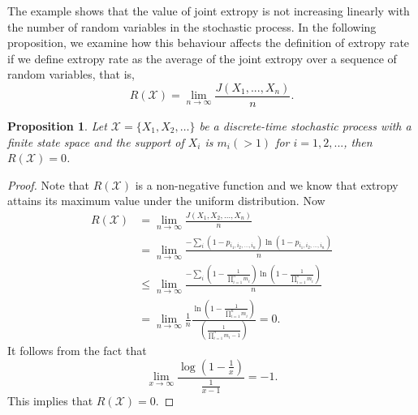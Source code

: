 \documentclass[pdflatex]{sn-jnl}%
\theoremstyle{thmstyleone}
\newtheorem{proposition}{Proposition}
\theoremstyle{thmstyletwo}%
\theoremstyle{thmstylethree}%
\begin{document}
The example shows that the value of joint extropy is not increasing linearly with the number of random variables in the stochastic process. In the following proposition, we examine how this behaviour affects the definition of extropy rate if we define extropy rate as the average of the joint extropy over a sequence of random variables, that is,
\begin{equation}\label{defination1}
    R(\mathcal{X})=\lim_{n\to \infty}\frac{J(X_1,...,X_n)}{n}.
\end{equation}
\begin{proposition}\label{prepositionofzero}
    Let $\bm{\mathcal{X}}=\{X_1, X_2, \ldots\}$ be a discrete-time stochastic process with a finite state space and the support of $X_i$ is \( m_i(>1) \) for $i=1,2,...$, then $R\left(\bm{\mathcal{X}}\right)=0$.
\end{proposition}
\begin{proof}
    Note that $R\left(\bm{\mathcal{X}}\right)$ is a non-negative function and we know that extropy attains its maximum value under the uniform distribution\cite{lad2015extropy}. Now 
    \begin{equation}
    \begin{split}
    R\left(\bm{\mathcal{X}}\right)&=\lim_{n\to \infty}\frac{J(X_1, X_2,...,X_n)}{n} \\
    &=\lim_{n\to \infty}\frac{-\sum_{i}\left(1-p_{i_1,i_2,...,i_n}\right)\ln\left(1-p_{i_1,i_2,...,i_n}\right)}{n} \\
    &\leq \lim_{n\to \infty}\frac{-\sum_{i}\left(1-\frac{1}{\prod_{i=1}^{n}m_i}\right)\ln\left(1-\frac{1}{\prod_{i=1}^{n}m_i}\right)}{n} \\
    &=\lim_{n\to \infty} \frac{1}{n} \frac{\ln\left(1-\frac{1}{\prod_{i=1}^{n}m_i}\right)}{\left(\frac{1}{\prod_{i=1}^{n}m_i-1}\right)}=0.
    \end{split}
    \end{equation}
    It follows from the fact that 
    \begin{equation}
        \lim_{x\to \infty}\frac{\log\left(1-\frac{1}{x}\right)}{\frac{1}{x-1}}=-1.
    \end{equation}
    This implies that $R\left(\bm{\mathcal{X}}\right)=0$.
\end{proof}
\end{document}
